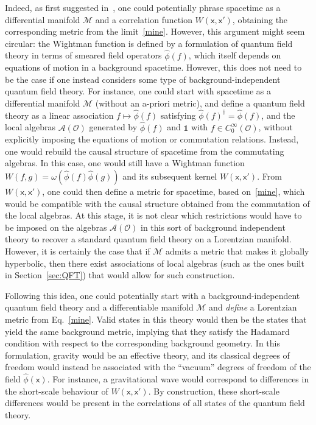 \documentclass[letterpaper,12pt,titlepage,oneside,final]{book}
\newcommand{\openone}{\mathds{1}}
\newcommand{\mf}{\mathsf}%
\begin{document}
Indeed, as first suggested in~\cite{achim2}, one could potentially phrase spacetime as a differential manifold $\mathcal{M}$ and a correlation function $W(\mf x, \mf x')$, obtaining the corresponding metric from the limit~\eqref{mine}. However, this argument might seem circular: the Wightman function is defined by a formulation of quantum field theory in terms of smeared field operators $\hat{\phi}(f)$, which itself depends on equations of motion in a background spacetime. However, this does not need to be the case if one instead considers some type of background-independent quantum field theory. For instance, one could start with spacetime as a differential manifold $\mathcal{M}$ (without an a-priori metric), and define a quantum field theory as a linear association $f\mapsto \hat{\phi}(f)$ satisfying $\hat{\phi}(f)^\dagger = \hat{\phi}(f)$, and the local algebras $\mathcal{A}(\mathcal{O})$ generated by $\hat{\phi}(f)$ and $\openone$ with $f\in C_0^\infty(\mathcal{O})$, without explicitly imposing the equations of motion or commutation relations. Instead, one would rebuild the causal structure of spacetime from the commutating algebras. In this case, one would still have a Wightman function $W(f,g) = \omega(\hat{\phi}(f)\hat{\phi}(g))$ and its subsequent kernel $W(\mf x, \mf x')$. From $W(\mf x, \mf x')$, one could then define a metric for spacetime, based on~\eqref{mine}, which would be compatible with the causal structure obtained from the commutation of the local algebras. At this stage, it is not clear which restrictions would have to be imposed on the algebras $\mathcal{A}(\mathcal{O})$ in this sort of background independent theory to recover a standard quantum field theory on a Lorentzian manifold. However, it is certainly the case that if $\mathcal{M}$ admits a metric that makes it globally hyperbolic, then there exist associations of local algebras (such as the ones built in Section~\ref{sec:QFT}) that would allow for such construction. 

Following this idea, one could potentially start with a background-independent quantum field theory and a differentiable manifold $\mathcal{M}$ and \textit{define} a Lorentzian metric from Eq.~\eqref{mine}. Valid states in this theory would then be the states that yield the same background metric, implying that they satisfy the Hadamard condition with respect to the corresponding background geometry. In this formulation, gravity would be an effective theory, and its classical degrees of freedom would instead be associated with the ``vacuum'' degrees of freedom of the field $\hat{\phi}(\mf x)$. For instance, a gravitational wave would correspond to differences in the short-scale behaviour of $W(\mf x, \mf x')$. By construction, these short-scale differences would be present in the correlations of all states of the quantum field theory.
\end{document}
